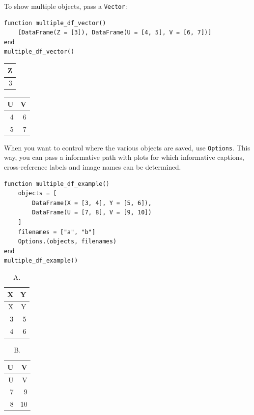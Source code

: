 \documentclass[
  14pt
  american,
  paper=a4,
  ,captions=tableheading
]{scrreprt}
\newcommand{\passthrough}[1]{#1}
\begin{document}
To show multiple objects, pass a \passthrough{\lstinline!Vector!}:

\begin{lstlisting}
function multiple_df_vector()
    [DataFrame(Z = [3]), DataFrame(U = [4, 5], V = [6, 7])]
end
multiple_df_vector()
\end{lstlisting}

\begin{longtable}[]{@{}r@{}}
\toprule
Z \\
\midrule
\endhead
3 \\
\bottomrule
\end{longtable}

\begin{longtable}[]{@{}rr@{}}
\toprule
U & V \\
\midrule
\endhead
4 & 6 \\
5 & 7 \\
\bottomrule
\end{longtable}

When you want to control where the various objects are saved, use
\passthrough{\lstinline!Options!}. This way, you can pass a informative
path with plots for which informative captions, cross-reference labels
and image names can be determined.

\begin{lstlisting}
function multiple_df_example()
    objects = [
        DataFrame(X = [3, 4], Y = [5, 6]),
        DataFrame(U = [7, 8], V = [9, 10])
    ]
    filenames = ["a", "b"]
    Options.(objects, filenames)
end
multiple_df_example()
\end{lstlisting}

\hypertarget{tbl:a}{}
\begin{longtable}[]{@{}rr@{}}
\caption{\label{tbl:a}A.}\tabularnewline
\toprule
X & Y \\
\midrule
\endfirsthead
\toprule
X & Y \\
\midrule
\endhead
3 & 5 \\
4 & 6 \\
\bottomrule
\end{longtable}

\hypertarget{tbl:b}{}
\begin{longtable}[]{@{}rr@{}}
\caption{\label{tbl:b}B.}\tabularnewline
\toprule
U & V \\
\midrule
\endfirsthead
\toprule
U & V \\
\midrule
\endhead
7 & 9 \\
8 & 10 \\
\bottomrule
\end{longtable}
\end{document}
